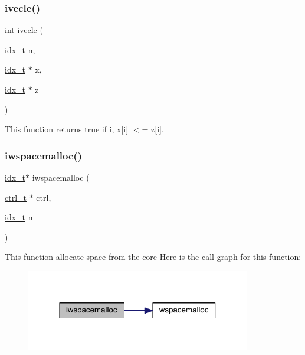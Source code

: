 \subsubsection{\texorpdfstring{ivecle()}{ivecle()}}
{\footnotesize\ttfamily int ivecle (\begin{DoxyParamCaption}\item[{\hyperlink{a00876_aaa5262be3e700770163401acb0150f52}{idx\+\_\+t}}]{n,  }\item[{\hyperlink{a00876_aaa5262be3e700770163401acb0150f52}{idx\+\_\+t} $\ast$}]{x,  }\item[{\hyperlink{a00876_aaa5262be3e700770163401acb0150f52}{idx\+\_\+t} $\ast$}]{z }\end{DoxyParamCaption})}

This function returns true if  i, x\mbox{[}i\mbox{]} $<$= z\mbox{[}i\mbox{]}. \mbox{\label{a00945_a441fc96c12245126725dabd436958502}} 
\subsubsection{\texorpdfstring{iwspacemalloc()}{iwspacemalloc()}}
{\footnotesize\ttfamily \hyperlink{a00876_aaa5262be3e700770163401acb0150f52}{idx\+\_\+t}$\ast$ iwspacemalloc (\begin{DoxyParamCaption}\item[{\hyperlink{a00742}{ctrl\+\_\+t} $\ast$}]{ctrl,  }\item[{\hyperlink{a00876_aaa5262be3e700770163401acb0150f52}{idx\+\_\+t}}]{n }\end{DoxyParamCaption})}

This function allocate space from the core Here is the call graph for this function\+:\nopagebreak
\begin{figure}[H]
\begin{center}
\leavevmode
\includegraphics[width=278pt]{a00945_a441fc96c12245126725dabd436958502_cgraph}
\end{center}
\end{figure}
\mbox{\label{a00945_ac4e797b3ea2db37f88f436fc6481b989}} 

